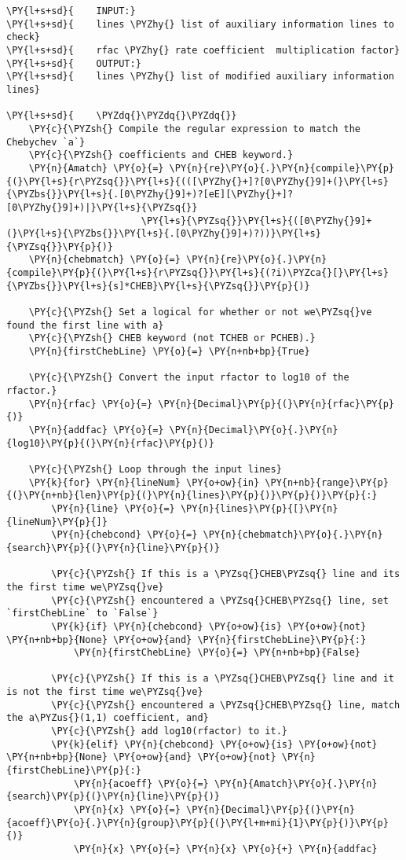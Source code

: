 \begin{Verbatim}[commandchars=\\\{\}]
\PY{l+s+sd}{    INPUT:}
\PY{l+s+sd}{    lines \PYZhy{} list of auxiliary information lines to check}
\PY{l+s+sd}{    rfac \PYZhy{} rate coefficient  multiplication factor}
\PY{l+s+sd}{    OUTPUT:}
\PY{l+s+sd}{    lines \PYZhy{} list of modified auxiliary information lines}

\PY{l+s+sd}{    \PYZdq{}\PYZdq{}\PYZdq{}}
    \PY{c}{\PYZsh{} Compile the regular expression to match the Chebychev `a`}
    \PY{c}{\PYZsh{} coefficients and CHEB keyword.}
    \PY{n}{Amatch} \PY{o}{=} \PY{n}{re}\PY{o}{.}\PY{n}{compile}\PY{p}{(}\PY{l+s}{r\PYZsq{}}\PY{l+s}{(([\PYZhy{}+]?[0\PYZhy{}9]+(}\PY{l+s}{\PYZbs{}}\PY{l+s}{.[0\PYZhy{}9]+)?[eE][\PYZhy{}+]?[0\PYZhy{}9]+)|}\PY{l+s}{\PYZsq{}}
                        \PY{l+s}{\PYZsq{}}\PY{l+s}{([0\PYZhy{}9]+(}\PY{l+s}{\PYZbs{}}\PY{l+s}{.[0\PYZhy{}9]+)?))}\PY{l+s}{\PYZsq{}}\PY{p}{)}
    \PY{n}{chebmatch} \PY{o}{=} \PY{n}{re}\PY{o}{.}\PY{n}{compile}\PY{p}{(}\PY{l+s}{r\PYZsq{}}\PY{l+s}{(?i)\PYZca{}[}\PY{l+s}{\PYZbs{}}\PY{l+s}{s]*CHEB}\PY{l+s}{\PYZsq{}}\PY{p}{)}

    \PY{c}{\PYZsh{} Set a logical for whether or not we\PYZsq{}ve found the first line with a}
    \PY{c}{\PYZsh{} CHEB keyword (not TCHEB or PCHEB).}
    \PY{n}{firstChebLine} \PY{o}{=} \PY{n+nb+bp}{True}

    \PY{c}{\PYZsh{} Convert the input rfactor to log10 of the rfactor.}
    \PY{n}{rfac} \PY{o}{=} \PY{n}{Decimal}\PY{p}{(}\PY{n}{rfac}\PY{p}{)}
    \PY{n}{addfac} \PY{o}{=} \PY{n}{Decimal}\PY{o}{.}\PY{n}{log10}\PY{p}{(}\PY{n}{rfac}\PY{p}{)}

    \PY{c}{\PYZsh{} Loop through the input lines}
    \PY{k}{for} \PY{n}{lineNum} \PY{o+ow}{in} \PY{n+nb}{range}\PY{p}{(}\PY{n+nb}{len}\PY{p}{(}\PY{n}{lines}\PY{p}{)}\PY{p}{)}\PY{p}{:}
        \PY{n}{line} \PY{o}{=} \PY{n}{lines}\PY{p}{[}\PY{n}{lineNum}\PY{p}{]}
        \PY{n}{chebcond} \PY{o}{=} \PY{n}{chebmatch}\PY{o}{.}\PY{n}{search}\PY{p}{(}\PY{n}{line}\PY{p}{)}

        \PY{c}{\PYZsh{} If this is a \PYZsq{}CHEB\PYZsq{} line and its the first time we\PYZsq{}ve}
        \PY{c}{\PYZsh{} encountered a \PYZsq{}CHEB\PYZsq{} line, set `firstChebLine` to `False`}
        \PY{k}{if} \PY{n}{chebcond} \PY{o+ow}{is} \PY{o+ow}{not} \PY{n+nb+bp}{None} \PY{o+ow}{and} \PY{n}{firstChebLine}\PY{p}{:}
            \PY{n}{firstChebLine} \PY{o}{=} \PY{n+nb+bp}{False}

        \PY{c}{\PYZsh{} If this is a \PYZsq{}CHEB\PYZsq{} line and it is not the first time we\PYZsq{}ve}
        \PY{c}{\PYZsh{} encountered a \PYZsq{}CHEB\PYZsq{} line, match the a\PYZus{}(1,1) coefficient, and}
        \PY{c}{\PYZsh{} add log10(rfactor) to it.}
        \PY{k}{elif} \PY{n}{chebcond} \PY{o+ow}{is} \PY{o+ow}{not} \PY{n+nb+bp}{None} \PY{o+ow}{and} \PY{o+ow}{not} \PY{n}{firstChebLine}\PY{p}{:}
            \PY{n}{acoeff} \PY{o}{=} \PY{n}{Amatch}\PY{o}{.}\PY{n}{search}\PY{p}{(}\PY{n}{line}\PY{p}{)}
            \PY{n}{x} \PY{o}{=} \PY{n}{Decimal}\PY{p}{(}\PY{n}{acoeff}\PY{o}{.}\PY{n}{group}\PY{p}{(}\PY{l+m+mi}{1}\PY{p}{)}\PY{p}{)}
            \PY{n}{x} \PY{o}{=} \PY{n}{x} \PY{o}{+} \PY{n}{addfac}


\end{Verbatim}
